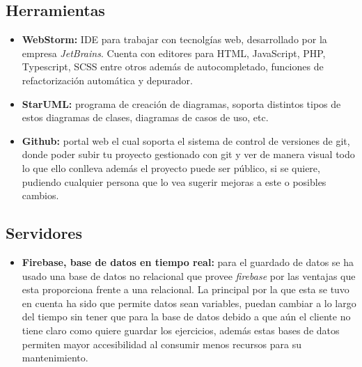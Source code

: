 \subsection{Herramientas}
\begin{itemize}
    \item\textbf{WebStorm:} IDE para trabajar con tecnolgías web, desarrollado por la empresa
    \textit{JetBrains}\cite{jetbrains}. Cuenta con editores para HTML, JavaScript, PHP,
    Typescript, SCSS entre otros además de autocompletado, funciones de refactorización
    automática y depurador.
    \item\textbf{StarUML:} programa de creación de diagramas, soporta distintos tipos de estos
    diagramas de clases, diagramas de casos de uso, etc.
    \item\textbf{Github:} portal web el cual soporta el sistema de control de versiones de git,
    donde poder subir tu proyecto gestionado con git y ver de manera visual todo lo que ello conlleva
    además el proyecto puede ser público, si se quiere, pudiendo cualquier persona que lo vea
    sugerir mejoras a este o posibles cambios.
\end{itemize}

\subsection{Servidores}
\begin{itemize}
    \item\textbf{Firebase, base de datos en tiempo real:} para el guardado de datos se ha usado
    una base de datos no relacional que provee \textit{firebase} por las ventajas que esta proporciona
    frente a una relacional. La principal por la que esta se tuvo en cuenta ha sido que permite
    datos sean variables, puedan cambiar a lo largo del tiempo sin tener que para la base de datos
    debido a que aún el cliente no tiene claro como quiere guardar los ejercicios, además estas
    bases de datos permiten mayor accesibilidad al consumir menos recursos para su mantenimiento.
\end{itemize}
